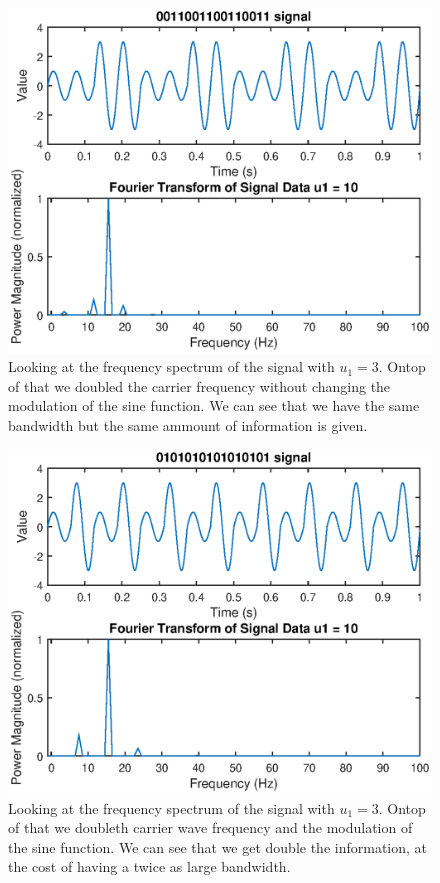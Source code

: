 \documentclass[11pt]{article}
\begin{document}
\begin{figure}[H]
	\centering
	\includegraphics[width=1\textwidth]{../ex2/fftU1-3-double-same}
	\caption{Looking at the frequency spectrum of the signal with $u_1 = 3$. Ontop of that we doubled the carrier frequency without changing the modulation of the sine function. We can see that we have the same bandwidth but the same ammount of information is given.}
	\label{fig:fftU1-3}
\end{figure}
\begin{figure}[H]
	\centering
	\includegraphics[width=1\textwidth]{../ex2/fftU1-3-double}
	\caption{Looking at the frequency spectrum of the signal with $u_1 = 3$. Ontop of that we doubleth carrier wave frequency and the modulation of the sine function. We can see that we get double the information, at the cost of having a twice as large bandwidth.}
	\label{fig:fftU1-10}
\end{figure}
\end{document}
